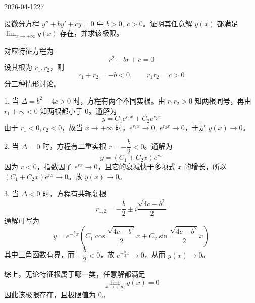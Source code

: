 \begin{mistake}{2026-04-12}{27}

\begin{problemcontent}
设微分方程 \( y''+by'+cy=0 \) 中 \( b>0,\ c>0 \)。证明其任意解 \( y(x) \) 都满足 \( \lim_{x\to +\infty} y(x) \) 存在，并求该极限。
\end{problemcontent}

\begin{solutioncontent}
对应特征方程为
\[
r^2+br+c=0
\]
设其根为 \(r_1,r_2\)，则
\[
r_1+r_2=-b<0,\qquad r_1r_2=c>0
\]
分三种情形讨论。

1. 当 \(\Delta=b^2-4c>0\) 时，方程有两个不同实根。由 \(r_1r_2>0\) 知两根同号，再由 \(r_1+r_2<0\) 知两根都小于 0。通解为
\[
y=C_1e^{r_1x}+C_2e^{r_2x}
\]
由于 \(r_1<0,r_2<0\)，故当 \(x\to +\infty\) 时，\(e^{r_1x}\to 0,\ e^{r_2x}\to 0\)，于是 \(y(x)\to 0\)。

2. 当 \(\Delta=0\) 时，方程有二重实根 \(r=-\dfrac b2<0\)。通解为
\[
y=(C_1+C_2x)e^{rx}
\]
因为 \(r<0\)，指数因子 \(e^{rx}\to 0\)，且它的衰减快于多项式 \(x\) 的增长，所以 \((C_1+C_2x)e^{rx}\to 0\)。故 \(y(x)\to 0\)。

3. 当 \(\Delta<0\) 时，方程有共轭复根
\[
r_{1,2}=-\frac b2\pm i\frac{\sqrt{4c-b^2}}2
\]
通解可写为
\[
y=e^{-\frac b2x}\left(C_1\cos \frac{\sqrt{4c-b^2}}2x+C_2\sin \frac{\sqrt{4c-b^2}}2x\right)
\]
其中三角函数有界，而 \(-\dfrac b2<0\)，故 \(e^{-\frac b2x}\to 0\)，从而 \(y(x)\to 0\)。

综上，无论特征根属于哪一类，任意解都满足
\[
\lim_{x\to +\infty}y(x)=0
\]
因此该极限存在，且极限值为 \(0\)。
\end{solutioncontent}


\end{mistake}
